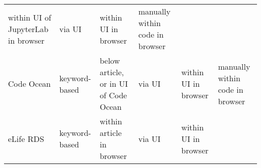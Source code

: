 \documentclass[onecolumn]{article}
\begin{document}
\begin{longtable}[]{@{}llllll@{}}
\begin{minipage}[t]{0.18\columnwidth}
within UI of JupyterLab in browser\strut
\end{minipage} & \begin{minipage}[t]{0.09\columnwidth}\raggedright
via UI\strut
\end{minipage} & \begin{minipage}[t]{0.18\columnwidth}\raggedright
within UI in browser\strut
\end{minipage} & \begin{minipage}[t]{0.15\columnwidth}\raggedright
manually within code in browser\strut
\end{minipage}\tabularnewline
\begin{minipage}[t]{0.12\columnwidth}\raggedright
Code Ocean\strut
\end{minipage} & \begin{minipage}[t]{0.12\columnwidth}\raggedright
keyword-based\strut
\end{minipage} & \begin{minipage}[t]{0.18\columnwidth}\raggedright
below article, or in UI of Code Ocean\strut
\end{minipage} & \begin{minipage}[t]{0.09\columnwidth}\raggedright
via UI\strut
\end{minipage} & \begin{minipage}[t]{0.18\columnwidth}\raggedright
within UI in browser\strut
\end{minipage} & \begin{minipage}[t]{0.15\columnwidth}\raggedright
manually within code in browser\strut
\end{minipage}\tabularnewline
\begin{minipage}[t]{0.12\columnwidth}\raggedright
eLife RDS\strut
\end{minipage} & \begin{minipage}[t]{0.12\columnwidth}\raggedright
keyword-based\strut
\end{minipage} & \begin{minipage}[t]{0.18\columnwidth}\raggedright
within article in browser\strut
\end{minipage} & \begin{minipage}[t]{0.09\columnwidth}\raggedright
via UI\strut
\end{minipage} & \begin{minipage}[t]{0.18\columnwidth}\raggedright
within UI in browser\strut
\end{minipage} & \begin{minipage}[t]{0.15\columnwidth}\raggedright

\end{minipage}
\end{longtable}
\end{document}
